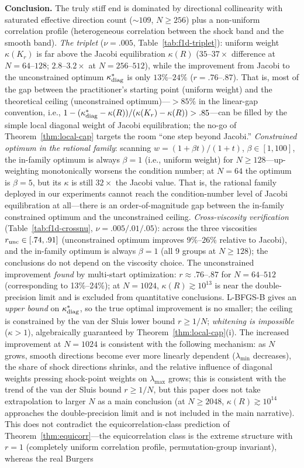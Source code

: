 \documentclass[11pt]{article}
\numberwithin{equation}{section}
\begin{document}
\noindent\textbf{Conclusion.} The truly stiff end is dominated by directional collinearity with saturated effective direction count ($\sim109$, $N\ge256$) plus a non-uniform correlation profile (heterogeneous correlation between the shock band and the smooth band). \emph{The triplet} ($\nu=.005$, Table~\ref{tab:f1d-triplet}): uniform weight $\kappa(K_r)$ is far above the Jacobi equilibration $\kappa(R)$ ($35$--$37\times$ difference at $N=64$--$128$; $2.8$--$3.2\times$ at $N=256$--$512$), while the improvement from Jacobi to the unconstrained optimum $\kappa^*_{\rm diag}$ is only $13\%$--$24\%$ ($r=.76$--$.87$). That is, most of the gap between the practitioner's starting point (uniform weight) and the theoretical ceiling (unconstrained optimum)---$>85\%$ in the linear-gap convention, i.e., $1-(\kappa^*_{\rm diag}-\kappa(R))/(\kappa(K_r)-\kappa(R))>.85$---can be filled by the simple local diagonal weight of Jacobi equilibration; the no-go of Theorem~\ref{thm:local-cap} targets the room ``one step beyond Jacobi.'' \emph{Constrained optimum in the rational family}: scanning $w=(1+\beta t)/(1+t)$, $\beta\in[1,100]$, the in-family optimum is always $\beta=1$ (i.e., uniform weight) for $N\ge128$---up-weighting monotonically worsens the condition number; at $N=64$ the optimum is $\beta=5$, but its $\kappa$ is still $32\times$ the Jacobi value. That is, the rational family deployed in our experiments cannot reach the condition-number level of Jacobi equilibration at all---there is an order-of-magnitude gap between the in-family constrained optimum and the unconstrained ceiling. \emph{Cross-viscosity verification} (Table~\ref{tab:f1d-crossnu}, $\nu=.005/.01/.05$): across the three viscosities $r_{\rm unc}\in[.74,.91]$ (unconstrained optimum improves $9\%$--$26\%$ relative to Jacobi), and the in-family optimum is always $\beta=1$ (all 9 groups at $N\ge128$); the conclusions do not depend on the viscosity choice. The unconstrained improvement \emph{found} by multi-start optimization: $r\approx.76$--$.87$ for $N=64$--$512$ (corresponding to 13\%--24\%); at $N=1024$, $\kappa(R)\gtrsim10^{13}$ is near the double-precision limit and is excluded from quantitative conclusions. L-BFGS-B gives an \emph{upper bound} on $\kappa^*_{\rm diag}$, so the true optimal improvement is no smaller; the ceiling is constrained by the van der Sluis lower bound $r\ge1/N$; \emph{whitening is impossible} ($\kappa>1$), algebraically guaranteed by Theorem~\ref{thm:local-cap}(i). The increased improvement at $N=1024$ is consistent with the following mechanism: as $N$ grows, smooth directions become ever more linearly dependent ($\lambda_{\min}$ decreases), the share of shock directions shrinks, and the relative influence of diagonal weights pressing shock-point weights on $\lambda_{\max}$ grows; this is consistent with the trend of the van der Sluis bound $r\ge1/N$, but this paper does not take extrapolation to larger $N$ as a main conclusion (at $N\ge2048$, $\kappa(R)\gtrsim10^{14}$ approaches the double-precision limit and is not included in the main narrative). This does not contradict the equicorrelation-class prediction of Theorem~\ref{thm:equicorr}---the equicorrelation class is the extreme structure with $r=1$ (completely uniform correlation profile, permutation-group invariant), whereas the real Burgers 
\end{document}
